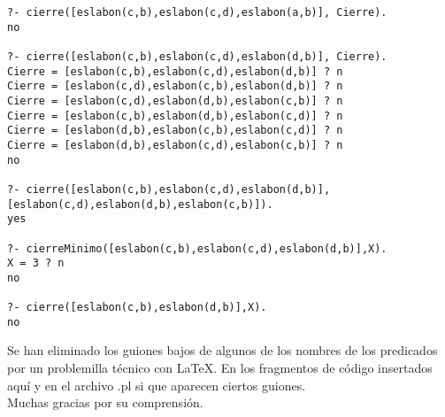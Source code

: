 \documentclass[11pt, a4paper]{article}
\begin{document}
\begin{lstlisting}[frame=single]
?- cierre([eslabon(c,b),eslabon(c,d),eslabon(a,b)], Cierre).
no

?- cierre([eslabon(c,b),eslabon(c,d),eslabon(d,b)], Cierre).
Cierre = [eslabon(c,b),eslabon(c,d),eslabon(d,b)] ? n
Cierre = [eslabon(c,d),eslabon(c,b),eslabon(d,b)] ? n
Cierre = [eslabon(c,d),eslabon(d,b),eslabon(c,b)] ? n
Cierre = [eslabon(c,b),eslabon(d,b),eslabon(c,d)] ? n
Cierre = [eslabon(d,b),eslabon(c,b),eslabon(c,d)] ? n
Cierre = [eslabon(d,b),eslabon(c,d),eslabon(c,b)] ? n
no

?- cierre([eslabon(c,b),eslabon(c,d),eslabon(d,b)], [eslabon(c,d),eslabon(d,b),eslabon(c,b)]).
yes

?- cierreMinimo([eslabon(c,b),eslabon(c,d),eslabon(d,b)],X).
X = 3 ? n 
no

?- cierre([eslabon(c,b),eslabon(d,b)],X).
no
\end{lstlisting}
\tiny *Se han eliminado los guiones bajos de algunos de los nombres de los predicados por un problemilla técnico con \LaTeX . En los fragmentos de código insertados aquí y en el archivo .pl si que aparecen ciertos guiones.
\\
Muchas gracias por su comprensión.
\end{document}
